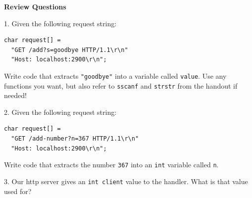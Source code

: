 \documentclass[oneside, landscape]{article}
\begin{document}
\textbf{Review Questions}

\vspace{1em}

1. Given the following request string:

\begin{lstlisting}[numbers=none, basicstyle=\ttfamily\small]
char request[] =
  "GET /add?s=goodbye HTTP/1.1\r\n"
  "Host: localhost:2900\r\n";
\end{lstlisting}

Write code that extracts \texttt{"goodbye"} into a variable
called \texttt{value}. Use any functions you want, but also
refer to {\tt sscanf} and {\tt strstr} from the handout if
needed!

\vspace{3em}

2. Given the following request string:

\begin{lstlisting}[numbers=none, basicstyle=\ttfamily\small]
char request[] =
  "GET /add-number?n=367 HTTP/1.1\r\n"
  "Host: localhost:2900\r\n";
\end{lstlisting}

Write code that extracts the number \texttt{367} into an
\texttt{int} variable called \texttt{n}.

\vspace{3em}

3. Our http server gives an \lstinline{int client} value to
the handler. What is that value used for?



\newpage

\end{document}
